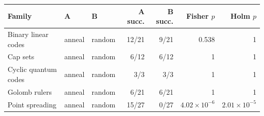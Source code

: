 \begin{tabular}{lllrrrr}
\toprule
Family & A & B & A succ. & B succ. & Fisher $p$ & Holm $p$\\
\midrule
Binary linear codes & anneal & random & 12/21 & 9/21 & 0.538 & 1\\
Cap sets & anneal & random & 6/12 & 6/12 & 1 & 1\\
Cyclic quantum codes & anneal & random & 3/3 & 3/3 & 1 & 1\\
Golomb rulers & anneal & random & 6/21 & 6/21 & 1 & 1\\
Point spreading & anneal & random & 15/27 & 0/27 & $4.02\times 10^{-6}$ & $2.01\times 10^{-5}$\\
\bottomrule
\end{tabular}
